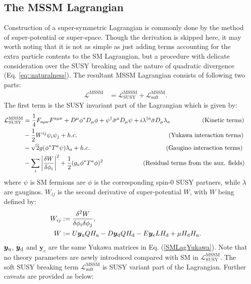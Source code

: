 \subsection{The MSSM Lagrangian} \label{sec::MSSMLag}
Construction of a super-symmetric Lagrangian is commonly done by the method of super-potential or super-space. Though the derivation is skipped here, it may worth noting that it is not as simple as just adding terms accounting for the extra particle contents to the SM Lagrangian, but a procedure with delicate consideration over the SUSY breaking and the nature of quadratic divergence (Eq. \ref{eq::naturalness}). The resultant MSSM Lagrangian consists of following two parts:
\begin{align}
\mathcal{L}^{\mathrm{MSSM}}
& = \mathcal{L}^{\mathrm{MSSM}}_{\mathrm{SUSY}} + \mathcal{L}^{\mathrm{MSSM}}_{\mathrm{soft}}. \label{eq::MSSMLag}
\end{align}
%
\noindent The first term is the SUSY invariant part of the Lagrangian which is given by:
\begin{align}
\mathcal{L}^{\mathrm{MSSM}}_{\mathrm{SUSY}} 
& = \frac{1}{4} F_{a\mu\nu} F^{a\mu\nu} + D^\mu\phi^* D_\mu \phi + \psi^\dg \bar{\sigma}^\mu D_\mu \psi + i \lambda^{\dg a} \bar{\sigma} D_\mu \lambda_a 
\mbox{\phantom{MkMMMM}(Kinetic terms)  } \nn \\
%
&  -\frac{1}{2} W^{ij} \psi_i \psi_j + h.c.
\mbox{\phantom{MMMMMMMMMMMMMMMM}(Yukawa interaction terms)  } \nn \\
%
&  - \sqrt{2} g (\phi^{*}T^a\psi) \lambda_a + h.c.
\mbox{\phantom{lMMMMMMMMMMMMM}(Gaugino interaction terms)  } \nn \\
%
&  - \sum_i\left| \frac{\delta W}{\delta\phi_i} \right|^2 +  \frac{1}{2} (g_a \phi^* T^a \phi)^2  \nn
\mbox{\phantom{MMMMMMM}(Residual terms from the aux. fields)  } 
\end{align}
where $\psi$ is SM fermions are $\phi$ is the corresponding spin-0 SUSY partners, while $\lambda$ are gauginos. $W_{ij}$ is the second derivative of super-potential $W$, with $W$ being defined by:
\begin{align}
W_{ij} & := \frac{\delta^2 W}{\delta \phi_i \delta \phi_j}, \nonumber \\
W & := U \bm{y}_{\mathrm{u}} Q H_{\mathrm{u}} - D \bm{y}_{\mathrm{d}} Q H_{\mathrm{d}} - E \bm{y}_e L H_{\mathrm{d}} + \mu H_{\mathrm{d}} H_{\mathrm{u}}.
\end{align}
$\bm{y}_{\mathrm{u}}$, $\bm{y}_{\mathrm{d}}$ and $\bm{y}_e$ are the same Yukawa matrices in Eq. (\ref{SMLagYukawa}). Note that no theory parameters are newly introduced compared with SM in $\mathcal{L}^{\mathrm{MSSM}}_{\mathrm{SUSY}}$.
The soft SUSY breaking term $\mathcal{L}^{\mathrm{MSSM}}_{\mathrm{soft}}$ is SUSY variant part of the Lagrangian. Further caveats are provided as below:   \\
%
